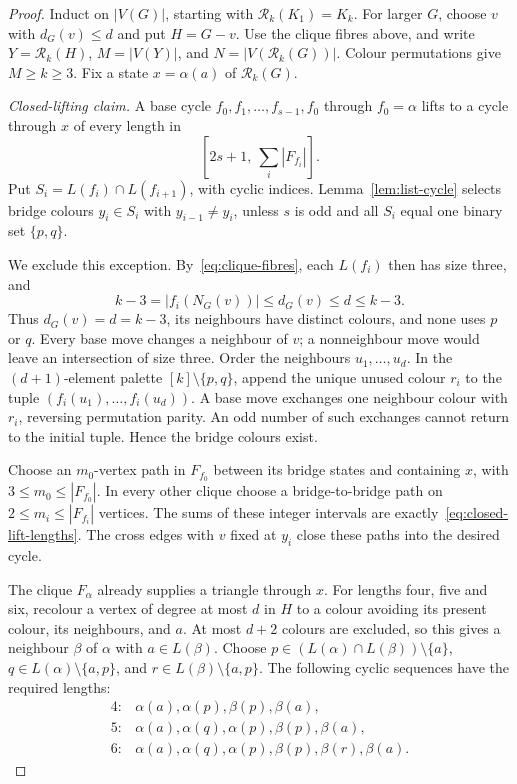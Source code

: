 \documentclass[11pt]{article}
\theoremstyle{remark}
\newcommand{\Rk}{\mathcal R_k}
\numberwithin{equation}{section}
\numberwithin{table}{section}
\begin{document}
\begin{proof}
Induct on $|V(G)|$, starting with $\Rk(K_1)=K_k$. For larger $G$,
choose $v$ with $d_G(v)\le d$ and put $H=G-v$.
Use the clique fibres above, and write
$Y=\Rk(H)$, $M=|V(Y)|$, and $N=|V(\Rk(G))|$.
Colour permutations give $M\ge k\ge3$.
Fix a state $x=\alpha(a)$ of $\Rk(G)$.

\emph{Closed-lifting claim.} A base cycle
$f_0,f_1,\ldots,f_{s-1},f_0$ through $f_0=\alpha$ lifts to a cycle
through $x$ of every length in
\begin{equation}\label{eq:closed-lift-lengths}
 [2s+1,\ \textstyle\sum_i|F_{f_i}|].
\end{equation}
Put $S_i=L(f_i)\cap L(f_{i+1})$, with cyclic indices.
Lemma~\ref{lem:list-cycle} selects bridge colours $y_i\in S_i$
with $y_{i-1}\ne y_i$, unless $s$ is odd and all $S_i$ equal
one binary set $\{p,q\}$.

We exclude this exception. By~\eqref{eq:clique-fibres}, each
$L(f_i)$ then has size three, and
\[
 k-3=|f_i(N_G(v))|\le d_G(v)\le d\le k-3.
\]
Thus $d_G(v)=d=k-3$, its neighbours have distinct colours, and
none uses $p$ or $q$. Every base move changes a neighbour of $v$;
a nonneighbour move would leave an intersection of size three.
Order the neighbours $u_1,\ldots,u_d$. In the $(d+1)$-element
palette $[k]\setminus\{p,q\}$, append the unique unused colour
$r_i$ to the tuple $(f_i(u_1),\ldots,f_i(u_d))$.
A base move exchanges one neighbour colour with $r_i$, reversing
permutation parity. An odd number of such exchanges cannot return
to the initial tuple. Hence the bridge colours exist.

Choose an $m_0$-vertex path in $F_{f_0}$ between its bridge states
and containing $x$, with $3\le m_0\le|F_{f_0}|$.
In every other clique choose a bridge-to-bridge path on
$2\le m_i\le|F_{f_i}|$ vertices. The sums of these integer intervals
are exactly~\eqref{eq:closed-lift-lengths}. The cross edges with $v$
fixed at $y_i$ close these paths into the desired cycle.

The clique $F_\alpha$ already supplies a triangle through $x$.
For lengths four, five and six, recolour a vertex of degree at most
$d$ in $H$ to a colour avoiding its present colour, its neighbours,
and $a$. At most $d+2$ colours are excluded, so this gives a neighbour
$\beta$ of $\alpha$ with $a\in L(\beta)$.
Choose $p\in(L(\alpha)\cap L(\beta))\setminus\{a\}$,
$q\in L(\alpha)\setminus\{a,p\}$, and
$r\in L(\beta)\setminus\{a,p\}$.
The following cyclic sequences have the required lengths:
\[
\begin{array}{ll}
4:&\alpha(a),\alpha(p),\beta(p),\beta(a),\\
5:&\alpha(a),\alpha(q),\alpha(p),\beta(p),\beta(a),\\
6:&\alpha(a),\alpha(q),\alpha(p),\beta(p),\beta(r),\beta(a).
\end{array}
\]


\end{proof}
\end{document}
